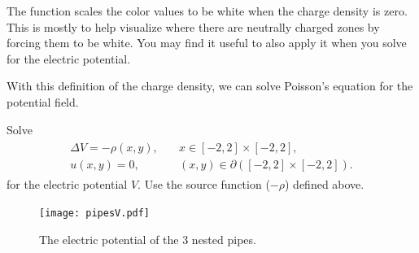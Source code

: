 The function  scales the color values to be white when the charge density is zero.
This is mostly to help visualize where there are neutrally charged zones by forcing them to be white.
You may find it useful to also apply it when you solve for the electric  potential.

With this definition of the charge density, we can solve Poisson's equation for the potential field.

\begin{problem}
Solve 
\begin{align}
	\begin{split}
	\Delta V = -\rho(x,y), &{}\quad x \in [-2,2]\times [-2,2],\\
	u(x,y) = 0, &{}\quad (x,y) \in \partial ([-2,2]\times [-2,2]).
	\end{split}
	\label{poisson2d:source}
\end{align}
% 
for the electric potential $V.$
Use the source function ($-\rho$) defined above. %
\end{problem}

\begin{figure}
\texttt{[image: pipesV.pdf]}
\caption{The electric potential of the 3 nested pipes.}
\end{figure}